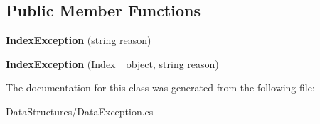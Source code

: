 \subsection*{Public Member Functions}
\begin{DoxyCompactItemize}
\item 
\hypertarget{class_dwarf_d_b_1_1_data_structures_1_1_index_exception_aee03e81543a53f20ddcca303c79018ad}{
{\bfseries IndexException} (string reason)}
\label{class_dwarf_d_b_1_1_data_structures_1_1_index_exception_aee03e81543a53f20ddcca303c79018ad}

\item 
\hypertarget{class_dwarf_d_b_1_1_data_structures_1_1_index_exception_a2c9bcab774735ac2406f852f55647d46}{
{\bfseries IndexException} (\hyperlink{class_dwarf_d_b_1_1_data_structures_1_1_index}{Index} \_\-object, string reason)}
\label{class_dwarf_d_b_1_1_data_structures_1_1_index_exception_a2c9bcab774735ac2406f852f55647d46}

\end{DoxyCompactItemize}


The documentation for this class was generated from the following file:\begin{DoxyCompactItemize}
\item 
DataStructures/DataException.cs\end{DoxyCompactItemize}
